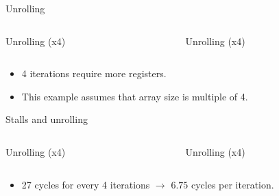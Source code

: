 \begin{frame}[t]{Unrolling}

\begin{columns}

\begin{column}{.45\textwidth}
\begin{block}{Unrolling (x4)}

\end{block}
\end{column}

\begin{column}{.45\textwidth}
\begin{block}{Unrolling (x4)}

\end{block}
\end{column}

\end{columns}
\begin{itemize}
  \item 4 iterations require more registers.
  \item This example assumes that array size is multiple of 4.
\end{itemize}
\end{frame}

\begin{frame}[t]{Stalls and unrolling}

\begin{columns}

\begin{column}{.45\textwidth}
\begin{block}{Unrolling (x4)}

\end{block}
\end{column}

\begin{column}{.45\textwidth}
\begin{block}{Unrolling (x4)}

\end{block}
\end{column}

\end{columns}
\begin{itemize}
  \item 27 cycles for every 4 iterations $\rightarrow$ $6.75$ cycles per iteration.
\end{itemize}
\end{frame}

